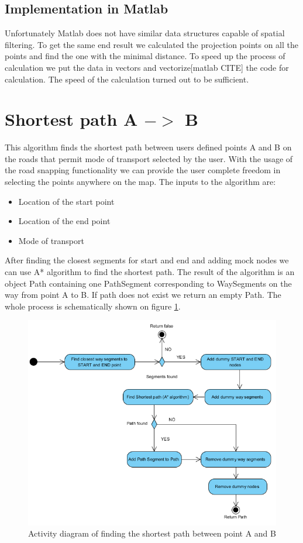 \documentclass[reqno,openany,12pt]{amsbook}
\theoremstyle{definition}
\theoremstyle{remark}
\begin{document}
\subsection{Implementation in Matlab}
Unfortunately Matlab does not have similar data structures capable of spatial filtering. To get the same end result we calculated the projection points on all the points and find the one with the minimal distance. To speed up the process of calculation we put the data in vectors and vectorize[matlab CITE] the code for calculation. The speed of the calculation turned out to be sufficient.

\section{Shortest path A $->$ B}
This algorithm finds the shortest path between users defined points A and B on the roads that permit mode of transport selected by the user. With the usage of the road snapping functionality we can provide the user complete freedom in selecting the points anywhere on the map. The inputs to the algorithm are:
\begin{itemize}
\item Location of the start point
\item Location of the end point
\item Mode of transport
\end{itemize}
After finding the closest segments for start and end and adding mock nodes we can use A* algorithm to find the shortest path. The result of the algorithm is an object Path containing one PathSegment corresponding to WaySegments on the way from point A to B. If path does not exist we return an empty Path. The whole process is schematically shown on figure \ref{fig:ab_activity}.
 \begin{figure}[h]
 \centering
 \includegraphics[width=0.7\linewidth]{../photos/shortest_path_ab_activity.png}
 \caption{Activity diagram of finding the shortest path between point A and B}
 \label{fig:ab_activity}
 \end{figure}
\end{document}
